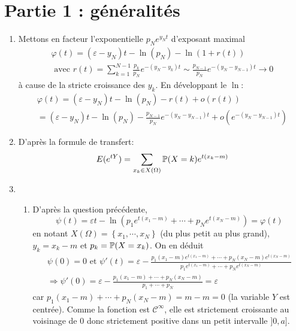 \section*{Partie 1 : généralités}
\begin{enumerate}
 \item Mettons en facteur l'exponentielle $p_Ne^{y_N t}$ d'exposant maximal
\begin{multline*}
 \varphi(t) = (\varepsilon -y_N)t -\ln(p_N) - \ln\left(1 + r(t)\right) \\ 
 \text{ avec }
 r(t) = \sum_{k=1}^{N-1}\frac{p_k}{p_N}e^{-(y_N - y_k)t} \sim \frac{p_{N-1}}{p_N} e^{-(y_N - y_{N-1})t} \rightarrow 0
\end{multline*}
à cause de la stricte croissance des $y_k$. En développant le $\ln$:
\begin{multline*}
 \varphi(t) = (\varepsilon -y_N)t -\ln(p_N) - r(t) + o(r(t))\\
 = (\varepsilon -y_N)t - \ln(p_N) - \frac{p_{N-1}}{p_N}e^{-(y_N - y_{N-1})t} + o(e^{-(y_N - y_{N-1})t})
\end{multline*}

\item D'après la formule de transfert:
\begin{displaymath}
 E(e^{tY}) = \sum_{x_k\in X(\Omega)}\mathbb{P}(X=k)e^{t(x_k-m)}
\end{displaymath}

\item 
\begin{enumerate}
 \item D'après la question précédente,
\begin{displaymath}
\psi(t) =
\varepsilon t -\ln\left( p_1e^{t(x_1-m)} +\cdots + p_Ne^{t(x_N-m)}\right) = \varphi(t)
\end{displaymath}
en notant $X(\Omega) = \left\lbrace x_1, \cdots, x_N\right\rbrace$ (du plus petit au plus grand), $y_k = x_k - m$ et $p_k= \mathbb{P}(X=x_k)$. On en déduit
\begin{multline*}
\psi(0) = 0 \text{ et }  \psi'(t) = \varepsilon -
\frac{p_1(x_1-m)e^{t(x_1-m)} +\cdots + p_N(x_N-m)e^{t(x_N-m)}}{p_1e^{t(x_1-m)} +\cdots + p_Ne^{t(x_N-m)}}\\
\Rightarrow \psi'(0) = \varepsilon-\frac{p_1(x_1-m) +\cdots + p_N(x_N-m)}{p_1 + \cdots + p_N}
= \varepsilon
\end{multline*}
car $p_1(x_1-m) +\cdots + p_N(x_N-m) = m-m = 0$ (la variable $Y$ est centrée). Comme la fonction est $\mathcal{C}^{\infty}$, elle est strictement croissante au voisinage de $0$ donc strictement positive dans un petit intervalle $]0,a]$.


\end{enumerate}
\end{enumerate}
